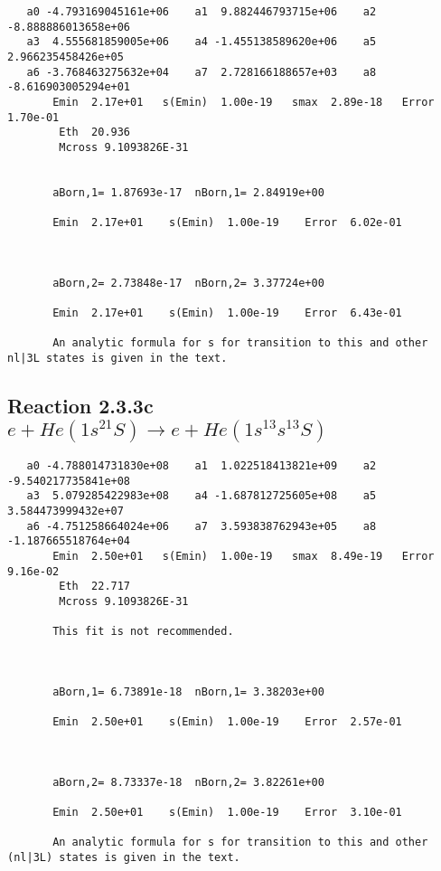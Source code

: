 \documentclass[12pt,dvipdfm]{article}
\begin{document}
\begin{small}\begin{verbatim}
   a0 -4.793169045161e+06    a1  9.882446793715e+06    a2 -8.888886013658e+06
   a3  4.555681859005e+06    a4 -1.455138589620e+06    a5  2.966235458426e+05
   a6 -3.768463275632e+04    a7  2.728166188657e+03    a8 -8.616903005294e+01
       Emin  2.17e+01   s(Emin)  1.00e-19   smax  2.89e-18   Error  1.70e-01
        Eth  20.936
        Mcross 9.1093826E-31


       aBorn,1= 1.87693e-17  nBorn,1= 2.84919e+00

       Emin  2.17e+01    s(Emin)  1.00e-19    Error  6.02e-01



       aBorn,2= 2.73848e-17  nBorn,2= 3.37724e+00

       Emin  2.17e+01    s(Emin)  1.00e-19    Error  6.43e-01

       An analytic formula for s for transition to this and other nl|3L states is given in the text.
\end{verbatim}\end{small}





\newpage
\subsection{
Reaction 2.3.3c $e + He(1s^21S) \rightarrow e + He(1s^13s^13S)$}

















\begin{small}\begin{verbatim}
   a0 -4.788014731830e+08    a1  1.022518413821e+09    a2 -9.540217735841e+08
   a3  5.079285422983e+08    a4 -1.687812725605e+08    a5  3.584473999432e+07
   a6 -4.751258664024e+06    a7  3.593838762943e+05    a8 -1.187665518764e+04
       Emin  2.50e+01   s(Emin)  1.00e-19   smax  8.49e-19   Error  9.16e-02
        Eth  22.717
        Mcross 9.1093826E-31

       This fit is not recommended.



       aBorn,1= 6.73891e-18  nBorn,1= 3.38203e+00

       Emin  2.50e+01    s(Emin)  1.00e-19    Error  2.57e-01



       aBorn,2= 8.73337e-18  nBorn,2= 3.82261e+00

       Emin  2.50e+01    s(Emin)  1.00e-19    Error  3.10e-01

       An analytic formula for s for transition to this and other (nl|3L) states is given in the text.
\end{verbatim}\end{small}
\end{document}

